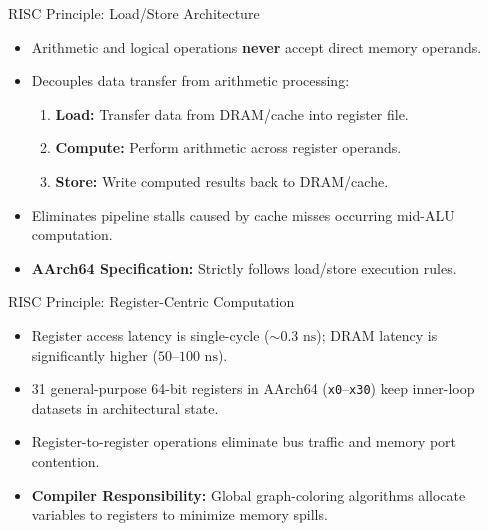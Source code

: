 \documentclass[aspectratio=169,11pt,t]{beamer}
\newcommand{\key}[1]{\textbf{#1}}
\newcommand{\bits}[1]{\texttt{#1}}
\begin{document}
\begin{frame}{RISC Principle: Load/Store Architecture}
\large
\begin{itemize}\setlength{\itemsep}{7pt}
  \item Arithmetic and logical operations \key{never} accept direct memory operands.
  \item Decouples data transfer from arithmetic processing:
  \begin{enumerate}\setlength{\itemsep}{4pt}
    \item \key{Load:} Transfer data from DRAM/cache into register file.
    \item \key{Compute:} Perform arithmetic across register operands.
    \item \key{Store:} Write computed results back to DRAM/cache.
  \end{enumerate}
  \item Eliminates pipeline stalls caused by cache misses occurring mid-ALU computation.
  \item \key{AArch64 Specification:} Strictly follows load/store execution rules.
\end{itemize}
\end{frame}


\begin{frame}{RISC Principle: Register-Centric Computation}
\large
\begin{itemize}\setlength{\itemsep}{8pt}
  \item Register access latency is single-cycle ($\sim 0.3\text{ ns}$); DRAM latency is significantly higher ($50\text{--}100\text{ ns}$).
  \item 31 general-purpose 64-bit registers in AArch64 (\bits{x0}--\bits{x30}) keep inner-loop datasets in architectural state.
  \item Register-to-register operations eliminate bus traffic and memory port contention.
  \item \key{Compiler Responsibility:} Global graph-coloring algorithms allocate variables to registers to minimize memory spills.
\end{itemize}
\end{frame}

\end{document}
